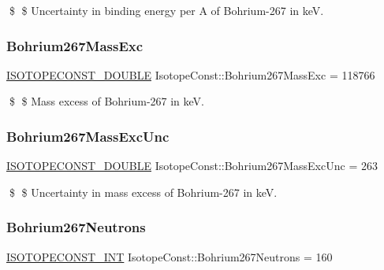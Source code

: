 \$ \$ Uncertainty in binding energy per A of Bohrium-\/267 in keV. \mbox{\label{group___isotope_const-_bohrium-_bh267_gaa8088440b4fde806a59d721a8b003f35}} 
\subsubsection{\texorpdfstring{Bohrium267\+Mass\+Exc}{Bohrium267MassExc}}
{\footnotesize\ttfamily \mbox{\hyperlink{group___isotope_const-_macros_ga8f45a7272ce02c0b4c65c44636ed719a}{I\+S\+O\+T\+O\+P\+E\+C\+O\+N\+S\+T\+\_\+\+D\+O\+U\+B\+LE}} Isotope\+Const\+::\+Bohrium267\+Mass\+Exc = 118766}

\$ \$ Mass excess of Bohrium-\/267 in keV. \mbox{\label{group___isotope_const-_bohrium-_bh267_gaa831d0ebc9647134d2029794be5c9586}} 
\subsubsection{\texorpdfstring{Bohrium267\+Mass\+Exc\+Unc}{Bohrium267MassExcUnc}}
{\footnotesize\ttfamily \mbox{\hyperlink{group___isotope_const-_macros_ga8f45a7272ce02c0b4c65c44636ed719a}{I\+S\+O\+T\+O\+P\+E\+C\+O\+N\+S\+T\+\_\+\+D\+O\+U\+B\+LE}} Isotope\+Const\+::\+Bohrium267\+Mass\+Exc\+Unc = 263}

\$ \$ Uncertainty in mass excess of Bohrium-\/267 in keV. \mbox{\label{group___isotope_const-_bohrium-_bh267_gab46dc352dc0810de4cca79f440bbd74f}} 
\subsubsection{\texorpdfstring{Bohrium267\+Neutrons}{Bohrium267Neutrons}}
{\footnotesize\ttfamily \mbox{\hyperlink{group___isotope_const-_macros_ga5f18360b3e99483a35c32d789e62621c}{I\+S\+O\+T\+O\+P\+E\+C\+O\+N\+S\+T\+\_\+\+I\+NT}} Isotope\+Const\+::\+Bohrium267\+Neutrons = 160}

